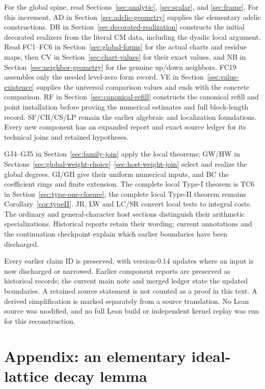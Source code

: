\documentclass[11pt,a4paper]{article}
\numberwithin{equation}{section}
\theoremstyle{remark}\newtheorem{remark}[theorem]{Remark}
\begin{document}
For the global spine, read Sections~\ref{sec:analytic},
\ref{sec:scalar}, and \ref{sec:frame}. For this increment, AD in
Section~\ref{sec:adelic-geometry} supplies the elementary adelic
constructions. DR in Section~\ref{sec:decorated-realization} constructs
the initial decorated realizers from the literal CM data, including
the dyadic local argument. Read FC1--FC6 in Section~\ref{sec:global-forms} for
the actual charts and residue maps, then CV in Section~\ref{sec:chart-values}
for their exact values, and NB in Section~\ref{sec:neighbor-geometry}
for the genuine up/down neighbors. FC19 assembles only the needed
level-zero form record. VE in Section~\ref{sec:value-existence} supplies
the universal comparison values and ends with the concrete comparison.
RF in Section~\ref{sec:canonical-refill} constructs the canonical refill
and point installation before proving the numerical estimates and full
block-length record. SF/CR/CS/LP remain the earlier algebraic and
localization foundations. Every new component has an expanded report
and exact source ledger for its technical joins and retained hypotheses.


GJ4--GJ5 in Section~\ref{sec:family-join} apply the local theorems;
GW/HW in Sections~\ref{sec:global-weight-choice}--\ref{sec:host-weight-join}
select and realize the global degrees. GI/GII give their uniform
numerical inputs, and BC the coefficient rings and finite extension.
The complete local Type-I theorem is TC6 in
Section~\ref{sec:type-one-closure}; the complete local Type-II theorem
remains Corollary~\ref{cor:typeII}. JR, LW and LC/SR convert local
tests to integral costs. The ordinary and general-character host
sections distinguish their arithmetic specializations. Historical
reports retain their wording; current annotations and the continuation
checkpoint explain which earlier boundaries have been discharged.

Every earlier claim ID is preserved, with version-0.14 updates where an input is now discharged or narrowed. Earlier component reports are preserved as historical records; the current main note and merged ledger state the updated boundaries. A retained source statement is not counted as a proof in this text. A derived simplification is marked separately from a source translation. No Lean source was modified, and no full Lean build or independent kernel replay was run for this reconstruction.

\section{Appendix: an elementary ideal-lattice decay lemma}
\label{app:ag-lattice}
\end{document}
